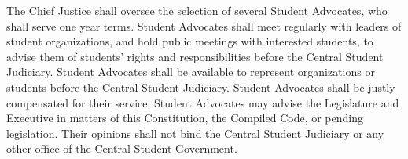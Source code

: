     The Chief Justice shall oversee the selection of several Student Advocates, who shall serve one year terms. Student Advocates shall meet regularly with leaders of student organizations, and hold public meetings with interested students, to advise them of students' rights and responsibilities before the Central Student Judiciary. Student Advocates shall be available to represent organizations or students before the Central Student Judiciary. Student Advocates shall be justly compensated for their service. Student Advocates may advise the Legislature and Executive in matters of this Constitution, the Compiled Code, or pending legislation. Their opinions shall not bind the Central Student Judiciary or any other office of the Central Student Government.